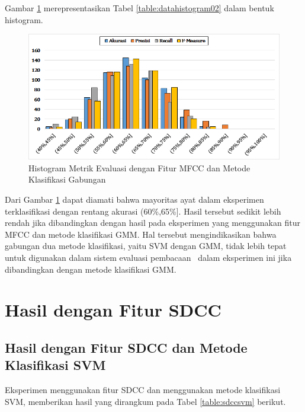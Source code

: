   Gambar \ref{fig:histogram02} merepresentasikan Tabel \ref{table:datahistogram02} dalam bentuk histogram.
  \begin{figure}
    \centering
    \includegraphics[width=\linewidth]{pics/histogram02}
    \caption{Histogram Metrik Evaluasi dengan Fitur MFCC dan Metode Klasifikasi Gabungan}
    \label{fig:histogram02}
  \end{figure}

  Dari Gambar \ref{fig:histogram02} dapat diamati bahwa mayoritas ayat dalam eksperimen terklasifikasi dengan rentang akurasi (60\%,65\%]. Hasil tersebut sedikit lebih rendah jika dibandingkan dengan hasil pada eksperimen yang menggunakan fitur MFCC dan metode klasifikasi GMM. Hal tersebut mengindikasikan bahwa gabungan dua metode klasifikasi, yaitu SVM dengan GMM, tidak lebih tepat untuk digunakan dalam sistem evaluasi pembacaan \quran~dalam eksperimen ini jika dibandingkan dengan metode klasifikasi GMM.





\section{Hasil dengan Fitur SDCC}

  \subsection{Hasil dengan Fitur SDCC dan Metode Klasifikasi SVM}
  Eksperimen menggunakan fitur SDCC dan menggunakan metode klasifikasi SVM, memberikan hasil yang dirangkum pada Tabel \ref{table:sdccsvm} berikut.

